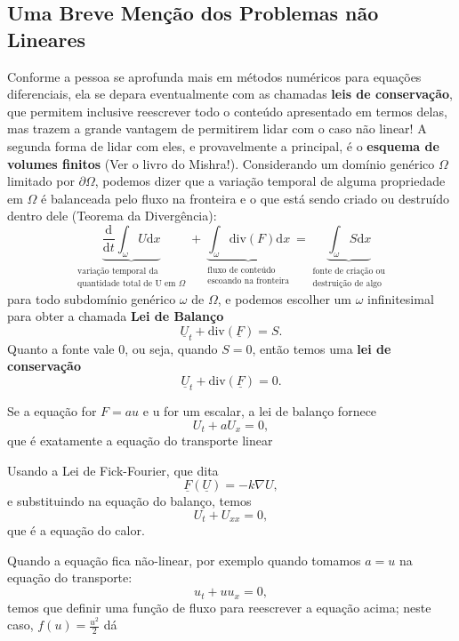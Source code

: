 \documentclass[../differential_methods.tex]{subfiles}
\begin{document}
\subsection{Uma Breve Menção dos Problemas não Lineares}
Conforme a pessoa se aprofunda mais em métodos numéricos para equações diferenciais, ela se depara eventualmente com as chamadas \textbf{leis de conservação}, que permitem inclusive reescrever todo o conteúdo apresentado em termos delas, mas trazem a grande vantagem de permitirem lidar com o caso não linear! A segunda forma de lidar com eles, e provavelmente a principal, é o \textbf{esquema de volumes finitos} (Ver o livro do Mishra!\cite{mishra2010}).
Considerando um domínio genérico \(\Omega \) limitado por \(\partial \Omega \), podemos dizer que a variação temporal de alguma propriedade em \(\Omega \) é balanceada pelo fluxo na fronteira e o que está sendo criado ou destruído dentro dele (Teorema da Divergência):
\[
	\underbrace{\frac{\mathrm{d}}{\mathrm{d}t}\int_{\omega }^{}U \mathrm{d}x}_{\substack{\text{variação temporal da} \\ \text{quantidade total de U em }\Omega }} + \underbrace{\int_{\omega }^{}\mathrm{div}(F) \mathrm{d}x}_{\substack{\text{fluxo de conteúdo} \\ \text{escoando na fronteira}}} = \underbrace{\int_{\omega }^{}S \mathrm{d}x}_{\substack{\text{fonte de criação ou} \\ \text{destruição de algo}}}
\]
para todo subdomínio genérico \(\omega \) de \(\Omega \), e podemos escolher um \(\omega \) infinitesimal para obter a chamada \textbf{Lei de Balanço}
\[
	\underline{U}_t + \mathrm{div}(\underline{F}) = S.
\]
Quanto a fonte vale 0, ou seja, quando \(S=0\), então temos uma \textbf{lei de conservação}
\[
	\underline{U}_t + \mathrm{div}(\underline{F}) = 0.
\]
\begin{example}
	Se a equação for \(F = au\) e u for um escalar, a lei de balanço fornece
	\[
		U_t + a U_x = 0,
	\]
	que é exatamente a equação do transporte linear
\end{example}
\begin{example}
	Usando a Lei de Fick-Fourier, que dita
	\[
		\underline{F}(\underline{U}) = -k \nabla U,
	\]
	e substituindo na equação do balanço, temos
	\[
		U_t + U_{xx} = 0,
	\]
	que é a equação do calor.
\end{example}
Quando a equação fica não-linear, por exemplo quando tomamos \(a = u\) na equação do transporte:
\[
	u_t + u u_x = 0,
\]
temos que definir uma função de fluxo para reescrever a equação acima; neste caso, \(f(u) = \frac{u^{2}}{2}\) dá
\end{document}
